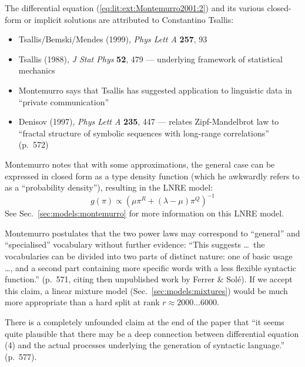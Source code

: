 \documentclass[a4paper]{article}
\begin{document}
The differential equation (\ref{eq:lit:ext:Montemurro2001:2}) and its various closed-form or implicit solutions are attributed to Constantino Tsallis:
\begin{itemize}
\item Tsallis/Bemski/Mendes (1999), \emph{Phys Lett A} \textbf{257}, 93
\item Tsallis (1988), \emph{J Stat Phys} \textbf{52}, 479 --- underlying framework of statistical mechanics
\item Montemurro says that Tsallis has suggested application to linguistic data in ``private communication''
\item Denisov (1997), \emph{Phys Lett A} \textbf{235}, 447 --- relates Zipf-Mandelbrot law to ``fractal structure of symbolic sequences with long-range correlations'' (p.~572)
\end{itemize}

Montemurro notes that with some approximations, the general case can be expressed in closed form as a type density function (which he awkwardly refers to as a ``probability density''), resulting in the LNRE model:
\begin{equation}
  \label{eq:lit:ext:Montemurro2001:4}
  g(\pi) \propto \left( \mu \pi^R + (\lambda-\mu) \pi^Q \right)^{-1}
\end{equation}
See Sec.~\ref{sec:models:montemurro} for more information on this LNRE model.

Montemurro postulates that the two power laws may correspond to ``general'' and ``specialised'' vocabulary without further evidence: ``This suggests \ldots\ the vocabularies can be divided into two parts of distinct nature: one of basic usage \dots, and a second part containing more specific words with a less flexible syntactic function.'' (p.~571, citing then unpublished work by Ferrer \& Solé).  If we accept this claim, a linear mixture model (Sec.~\ref{sec:models:mixtures}) would be much more appropriate than a hard split at rank $r\approx 2000 \ldots 6000$.

There is a completely unfounded claim at the end of the paper that ``it seems quite plausible that there may be a deep connection between differential equation (4) and the actual processes underlying the generation of syntactic language.'' (p.~577).



\end{document}
